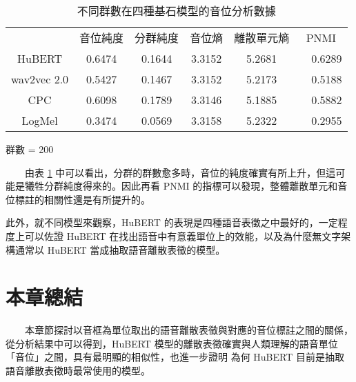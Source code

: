 \begin{table}[!htbp]
            \begin{subtable}[t]{\textwidth}
                \centering
                \begin{tabular}{cccccc}
                                & 音位純度 & 分群純度 & 音位熵 & 離散單元熵 &    PNMI \\
                    HuBERT      &   0.6474 &   0.1644 & 3.3152 &     5.2681 &　0.6289 \\   %
                    wav2vec 2.0 &   0.5427 &   0.1467 & 3.3152 &     5.2173 &　0.5188 \\   %
                    CPC         &   0.6098 &   0.1789 & 3.3146 &     5.1885 &　0.5882 \\   %
                    LogMel      &   0.3474 &   0.0569 & 3.3158 &     5.2322 &　0.2955 \\   %
                \end{tabular}
                \caption{群數 = 200}
                \label{tab:ch3-clu200}
            \end{subtable}        

            \caption{不同群數在四種基石模型的音位分析數據}
            \label{tab:single-cluster-results}
        \end{table}

　　由表 \ref{tab:single-cluster-results} 中可以看出，分群的群數愈多時，音位的純度確實有所上升，但這可能是犧牲分群純度得來的。因此再看 PNMI 的指標可以發現，整體離散單元和音位標註的相關性還是有所提升的。

        此外，就不同模型來觀察，HuBERT 的表現是四種語音表徵之中最好的，一定程度上可以佐證 HuBERT 在找出語音中有意義單位上的效能，以及為什麼無文字架構通常以 HuBERT 當成抽取語音離散表徵的模型。



\section{本章總結}

　　本章節探討以音框為單位取出的語音離散表徵與對應的音位標註之間的關係，從分析結果中可以得到，HuBERT 模型的離散表徵確實與人類理解的語音單位「音位」之間，具有最明顯的相似性，也進一步證明
為何 HuBERT 目前是抽取語音離散表徵時最常使用的模型。
